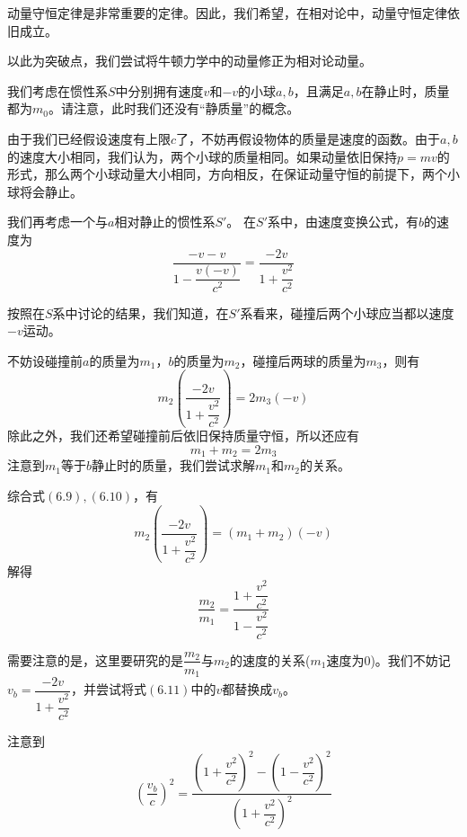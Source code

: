 \begin{prove}[$p=\gamma mv$]
    动量守恒定律是非常重要的定律。因此，我们希望，在相对论中，动量守恒定律依旧成立。

    以此为突破点，我们尝试将牛顿力学中的动量修正为相对论动量。

    我们考虑在惯性系$S$中分别拥有速度$v$和$-v$的小球$a,b$，且满足$a,b$在静止时，质量都为$m_0$。请注意，此时我们还没有``静质量''的概念。

    由于我们已经假设速度有上限$c$了，不妨再假设物体的质量是速度的函数。由于$a,b$的速度大小相同，我们认为，两个小球的质量相同。如果动量依旧保持$p=mv$的形式，那么两个小球动量大小相同，方向相反，在保证动量守恒的前提下，两个小球将会静止。

    我们再考虑一个与$a$相对静止的惯性系$S'$。
    在$S'$系中，由速度变换公式，有$b$的速度为
    \[\dfrac{-v-v}{1-\dfrac{v(-v)}{c^2}}=\dfrac{-2v}{1+\dfrac{v^2}{c^2}}\]

    按照在$S$系中讨论的结果，我们知道，在$S'$系看来，碰撞后两个小球应当都以速度$-v$运动。

    不妨设碰撞前$a$的质量为$m_1$，$b$的质量为$m_2$，碰撞后两球的质量为$m_3$，则有
    \begin{equation}
        m_2\left(\dfrac{-2v}{1+\dfrac{v^2}{c^2}}\right)=2m_3(-v)
    \end{equation}
    除此之外，我们还希望碰撞前后依旧保持质量守恒，所以还应有
    \begin{equation}
        m_1+m_2=2m_3
    \end{equation}
    注意到$m_1$等于$b$静止时的质量，我们尝试求解$m_1$和$m_2$的关系。

    综合式$(6.9),(6.10)$，有
    \[m_2\left(\dfrac{-2v}{1+\dfrac{v^2}{c^2}}\right)=(m_1+m_2)(-v)\]
    解得
    \begin{equation}
        \dfrac{m_2}{m_1}=\dfrac{1+\dfrac{v^2}{c^2}}{1-\dfrac{v^2}{c^2}}
    \end{equation}

    需要注意的是，这里要研究的是$\dfrac{m_2}{m_1}$与$m_2$的速度的关系($m_1$速度为$0$)。我们不妨记$v_b=\dfrac{-2v}{1+\dfrac{v^2}{c^2}}$，并尝试将式$(6.11)$中的$v$都替换成$v_b$。

    注意到
    \[\left(\dfrac{v_b}{c}\right)^2=\dfrac{\left(1+\dfrac{v^2}{c^2}\right)^2-\left(1-\dfrac{v^2}{c^2}\right)^2}{\left(1+\dfrac{v^2}{c^2}\right)^2}\]


\end{prove}

